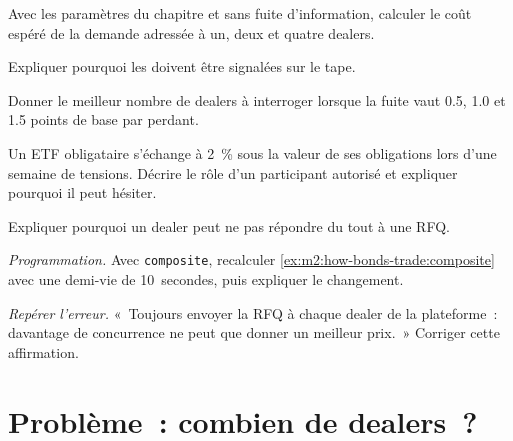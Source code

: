\begin{exercise}[$\star$]\label{exo:m2:how-bonds-trade:2}
Avec les paramètres du chapitre et sans fuite d'information, calculer le coût espéré
de la demande adressée à un, deux et quatre dealers.
\end{exercise}

\begin{exercise}[$\star$]\label{exo:m2:how-bonds-trade:3}
Expliquer pourquoi les  doivent être signalées sur le tape.
\end{exercise}

\begin{exercise}[$\star\star$]\label{exo:m2:how-bonds-trade:4}
Donner le meilleur nombre de dealers à interroger lorsque la fuite vaut 0.5, 1.0 et 1.5 points de base
par perdant.
\end{exercise}

\begin{exercise}[$\star\star$]\label{exo:m2:how-bonds-trade:5}
Un ETF obligataire s'échange à 2~\% sous la valeur de ses obligations lors d'une semaine de tensions.
Décrire le rôle d'un participant autorisé et expliquer pourquoi il peut hésiter.
\end{exercise}

\begin{exercise}[$\star\star$]\label{exo:m2:how-bonds-trade:6}
Expliquer pourquoi un dealer peut ne pas répondre du tout à une RFQ.
\end{exercise}

\begin{exercise}[$\star\star\star$]\label{exo:m2:how-bonds-trade:7}
\emph{Programmation.} Avec \texttt{composite}, recalculer \cref{ex:m2:how-bonds-trade:composite}
avec une demi-vie de 10~secondes, puis expliquer le changement.
\end{exercise}

\begin{exercise}[$\star\star\star$]\label{exo:m2:how-bonds-trade:8}
\emph{Repérer l'erreur.} «~Toujours envoyer la RFQ à chaque dealer de la plateforme~: davantage
de concurrence ne peut que donner un meilleur prix.~» Corriger cette affirmation.
\end{exercise}

\section{Problème~: combien de dealers~?}

